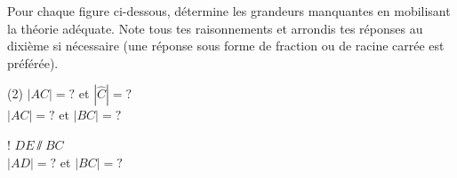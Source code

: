 \documentclass[../partie2.tex]{subfiles}
\begin{document}
\begin{exercise}[points=6]
    Pour chaque figure ci-dessous, détermine les grandeurs manquantes en mobilisant la théorie adéquate. Note tous tes raisonnements et arrondis tes réponses au dixième si nécessaire (une réponse sous forme de fraction ou de racine carrée est préférée).

    \begin{tasks}[after-item-skip=2cm](2)
        \task
        $|AC| = ?$ et $|\widehat{C}|=?$\\

        \task
        $|AC|=?$ et $|BC|=?$
        \begin{center}
            
        \end{center}

        \task!
        $DE \sslash BC$\\$|AD|=?$ et $|BC|=?$
        \begin{center}
            
        \end{center}

    \end{tasks}
\end{exercise}
\end{document}

